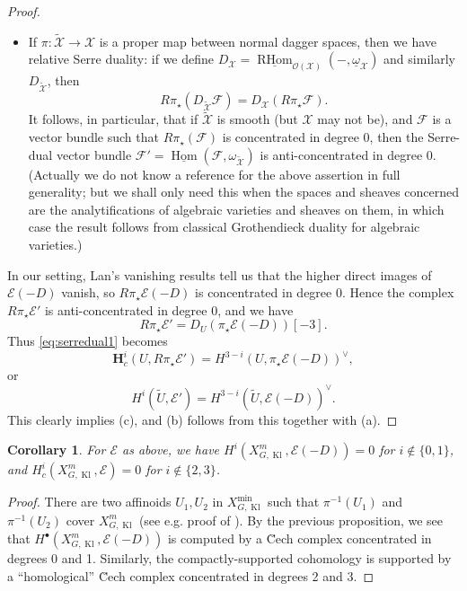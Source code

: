 \documentclass[cjm]{ipart}
\theoremstyle{plain}
\newtheorem{corollary}[theorem]{Corollary}
\theoremstyle{remark}
\DeclareMathOperator{\Hom}{Hom}
\DeclareMathOperator{\Kl}{Kl}
\newcommand{\HH}{\mathbf{H}}
\newcommand{\cE}{\mathcal{E}}
\newcommand{\cF}{\mathcal{F}}
\newcommand{\cO}{\mathcal{O}}
\newcommand{\cX}{\mathcal{X}}
\numberwithin{equation}{subsection}
\begin{document}
\begin{proof}
\begin{itemize}
   \item If $\pi: \tilde{\cX} \to \cX$ is a proper map between normal dagger spaces, then we have relative Serre duality: if we define $D_{\cX} = \underline{\operatorname{RHom}}_{\cO(\cX)}(-, \underline{\omega}_{\cX})$ and similarly $D_{\tilde{\cX}}$, then
   \[ R\pi_\star\left(D_{\tilde{\cX}} \cF\right) = D_{\cX}\left(R\pi_\star \cF\right). \]
   It follows, in particular, that if $\tilde{\cX}$ is smooth (but $\cX$ may not be), and $\cF$ is a vector bundle such that $R\pi_\star(\cF)$ is concentrated in degree 0, then the Serre-dual vector bundle $\cF' = \underline{\Hom}(\cF, \omega_{\tilde{\cX}})$ is anti-concentrated in degree 0. (Actually we do not know a reference for the above assertion in full generality; but we shall only need this when the spaces and sheaves concerned are the analytifications of algebraic varieties and sheaves on them, in which case the result follows from classical Grothendieck duality for algebraic varieties.)
   \end{itemize}

   In our setting, Lan's vanishing results tell us that the higher direct images of $\cE(-D)$ vanish, so $R\pi_\star \cE(-D)$ is concentrated in degree 0. Hence the complex $R\pi_\star \cE'$ is anti-concentrated in degree 0, and we have
   \[ R\pi_\star \cE' = D_U(\pi_\star \cE(-D))[-3].\]
   Thus \eqref{eq:serredual1} becomes
   \[ \HH^i_c(U, R\pi_\star \cE') = H^{3-i}(U, \pi_\star \cE(-D))^\vee, \]
   or
   \[ H^i(\tilde{U}, \cE') = H^{3-i}(\tilde{U}, \cE(-D))^\vee. \]
   This clearly implies (c), and (b) follows from this together with (a).
  \end{proof}

  \begin{corollary}
   \label{cor:ge1vanish}
   For $\cE$ as above, we have $H^i(X_{G,\Kl}^m, \cE(-D)) = 0$ for $i \notin \{0, 1\}$, and $H^i_c(X_{G,\Kl}^m, \cE) = 0$ for $i \notin \{2, 3\}$.
  \end{corollary}

  \begin{proof}
   There are two affinoids $U_1, U_2$ in $X_{G,\Kl}^{\min}$ such that $\pi^{-1}(U_1)$ and $\pi^{-1}(U_2)$ cover $X_{G,\Kl}^m$ (see e.g. proof of \cite[Lemma 14.8.2]{pilloni20}). By the previous proposition, we see that $H^\bullet(X_{G,\Kl}^m, \cE(-D))$ is computed by a \u{C}ech complex concentrated in degrees 0 and 1. Similarly, the compactly-supported cohomology is supported by a ``homological'' \u{C}ech complex concentrated in degrees 2 and 3.
  \end{proof}
\end{document}
